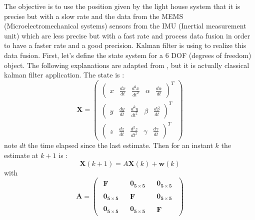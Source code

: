 \documentclass{vldb}
\begin{document}
The objective is to use the position given by the light house system that it is precise but with a slow rate and the data from the MEMS (Microelectromechanical systems) sensors from the IMU (Inertial measurement unit) which are less precise but with a fast rate and process data fusion in order to have a faster rate and a good precision. Kalman filter is using to realize this data fusion. First, let's define the state system for a 6 DOF (degrees of freedom) object. The following explanations are adapted from \cite{caron2006gps}, but it is actually classical kalman filter application. The state is :
\begin{equation}
\mathbf{X} = 
\begin{pmatrix}
\begin{pmatrix}
x & \frac{dx}{dt} & \frac{d^2x}{dt^2} & \alpha & \frac{d\alpha}{dt}
\end{pmatrix} ^T \\
\begin{pmatrix}
y & \frac{dy}{dt} & \frac{d^2y}{dt^2} & \beta & \frac{d\beta}{dt}
\end{pmatrix} ^T \\
\begin{pmatrix}
z & \frac{dz}{dt} &  \frac{d^2z}{dt^2} & \gamma & \frac{d\gamma}{dt}
\end{pmatrix} ^T
\end{pmatrix}
\end{equation}
note $dt$ the time elapsed since the last estimate. Then for an instant $k$ the estimate at $k+1$ is : 
\begin{equation}
\mathbf{X}(k+1) = A \mathbf{X}(k) +  \mathbf{w}(k)
\end{equation}
with $$\mathbf{A}=
\begin{pmatrix}
\begin{matrix}
\mathbf{F}
\end{matrix} &
\begin{matrix}
\mathbf{0_{5 \times 5}}
\end{matrix} &
\begin{matrix}
\mathbf{0_{5 \times 5}}
\end{matrix} \\
\begin{matrix}
\mathbf{0_{5 \times 5}}
\end{matrix} &
\begin{matrix}
\mathbf{F}
\end{matrix} &
\begin{matrix}
\mathbf{0_{5 \times 5}}
\end{matrix} \\
\begin{matrix}
\mathbf{0_{5 \times 5}}
\end{matrix} &
\begin{matrix}
\mathbf{0_{5 \times 5}}
\end{matrix} &
\begin{matrix}
\mathbf{F}
\end{matrix}
\end{pmatrix}$$
\end{document}
